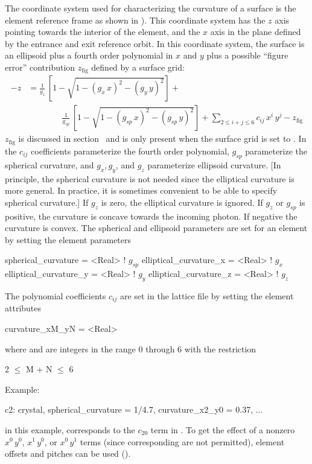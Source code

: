 The coordinate system used for characterizing the curvature of a surface is the element reference
frame as shown in ). This coordinate system has the $z$ axis pointing towards the
interior of the element, and the $x$ axis in the plane defined by the entrance and exit reference
orbit. In this coordinate system, the surface is an ellipsoid plus a fourth order polynomial in $x$
and $y$ plus a possible ``figure error'' contribution $z_\text{fig}$ defined by a surface grid:
\begin{align}
  \label{xs2ij4}
  {-z} &= \frac{1}{g_z} \, \left[ 1 - \sqrt{1 - (g_x \, x)^2 - (g_y \, y)^2} \right] + \\
  &\qquad \qquad \frac{1}{g_{sp}} \, \left[ 1 - \sqrt{1 - (g_{sp} \, x)^2 - (g_{sp} \, y)^2} \right] + 
  \sum_{2 \le i+j \le 6} c_{ij} \, x^i \, y^j - z_\text{fig} \nonumber
\end{align}
$z_\text{fig}$ is discussed in section~ and is only present when the surface grid
 is set to . In  the $c_{ij}$ coefficients parameterize the
fourth order polynomial, $g_{sp}$ parameterize the spherical curvature, and $g_x, g_y$, and $g_z$
parameterize ellipsoid curvature. [In principle, the spherical curvature is not needed since the
elliptical curvature is more general. In practice, it is sometimes convenient to be able to specify spherical
curvature.]  If $g_z$ is zero, the elliptical curvature is ignored. If $g_z$ or $g_{sp}$ is
positive, the curvature is concave towards the incoming photon. If negative the curvature is convex.
The spherical and ellipsoid parameters are set for an element by setting the element parameters
\begin{example}
  spherical_curvature    = <Real>   ! \(g_{sp}\)
  elliptical_curvature_x = <Real>   ! \(g_{x}\)
  elliptical_curvature_y = <Real>   ! \(g_{y}\)
  elliptical_curvature_z = <Real>   ! \(g_{z}\)
\end{example}

The polynomial coefficients $c_{ij}$ are set in the lattice file by setting the
element attributes
\begin{example}
  curvature_xM_yN = <Real>   
\end{example}
where  and  are integers in the range 0 through 6 with the restriction
\begin{example}
  2 \(\le\) M + N \(\le\) 6
\end{example}
Example:
\begin{example}
  c2: crystal, spherical_curvature = 1/4.7, curvature_x2_y0 = 0.37, ...
\end{example}
in this example,  corresponds to the $c_{20}$ term
in . To get the effect of a nonzero $x^0\, y^0$, $x^1 \,
y^0$, or $x^0 \, y^1$ terms (since corresponding 
are not permitted), element offsets and pitches can be used
().

